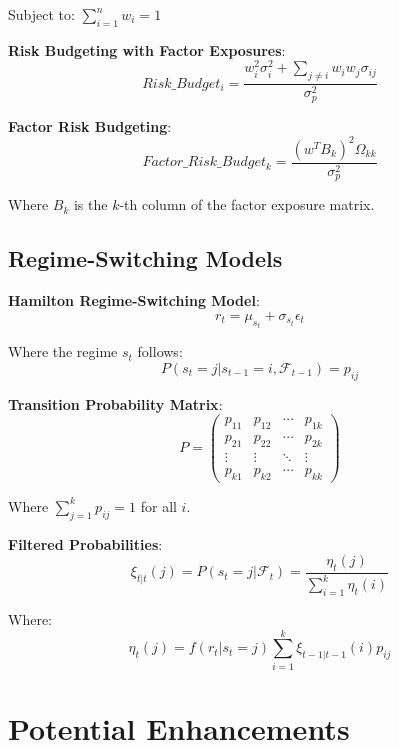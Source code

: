 \documentclass[12pt,a4paper]{article}
\begin{document}
Subject to: $\sum_{i=1}^n w_i = 1$

\textbf{Risk Budgeting with Factor Exposures}:
\begin{equation}
Risk\_Budget_i = \frac{w_i^2 \sigma_i^2 + \sum_{j \neq i} w_i w_j \sigma_{ij}}{\sigma_p^2}
\end{equation}

\textbf{Factor Risk Budgeting}:
\begin{equation}
Factor\_Risk\_Budget_k = \frac{(w^T B_k)^2 \Omega_{kk}}{\sigma_p^2}
\end{equation}

Where $B_k$ is the $k$-th column of the factor exposure matrix.

\subsection{Regime-Switching Models}

\textbf{Hamilton Regime-Switching Model}:
\begin{equation}
r_t = \mu_{s_t} + \sigma_{s_t} \epsilon_t
\end{equation}

Where the regime $s_t$ follows:
\begin{equation}
P(s_t = j | s_{t-1} = i, \mathcal{F}_{t-1}) = p_{ij}
\end{equation}

\textbf{Transition Probability Matrix}:
\begin{equation}
P = \begin{pmatrix}
p_{11} & p_{12} & \cdots & p_{1k} \\
p_{21} & p_{22} & \cdots & p_{2k} \\
\vdots & \vdots & \ddots & \vdots \\
p_{k1} & p_{k2} & \cdots & p_{kk}
\end{pmatrix}
\end{equation}

Where $\sum_{j=1}^k p_{ij} = 1$ for all $i$.

\textbf{Filtered Probabilities}:
\begin{equation}
\xi_{t|t}(j) = P(s_t = j | \mathcal{F}_t) = \frac{\eta_t(j)}{\sum_{i=1}^k \eta_t(i)}
\end{equation}

Where:
\begin{equation}
\eta_t(j) = f(r_t | s_t = j) \sum_{i=1}^k \xi_{t-1|t-1}(i) p_{ij}
\end{equation}

\section{Potential Enhancements}
\end{document}
